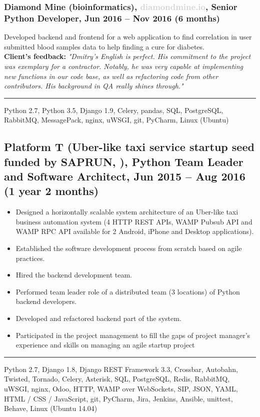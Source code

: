 \documentclass[a4paper,8pt]{extarticle}
\newcommand{\chref}[2]{\href{#1}{\underline{\smash{#2}}}}  %
\newcommand{\itchref}[2]{\chref{#1}{\textit{#2}}}  %
\newcommand{\chrule}{\vspace{3pt}\hrule}
\begin{document}
\subsubsection*{Diamond Mine (bioinformatics), \textcolor{lightgray}{diamondmine.io}, Senior Python Developer, Jun 2016 -- Nov 2016 (6 months)}
Developed backend and frontend for a web application to find correlation in user submitted blood samples data to help finding a cure for diabetes.\\
\textbf{Client's feedback:} \textit{"Dmitry's English is perfect. His commitment to the project was exemplary for a contractor. Notably, he was very capable at implementing new functions in our code base, as well as refactoring code from other contributors. His background in QA really shines through."}
\chrule
Python 2.7, Python 3.5, Django 1.9, Celery, pandas, SQL, PostgreSQL, RabbitMQ, MessagePack, nginx, uWSGI, git, PyCharm, Linux (Ubuntu)

\subsection*{Platform T (Uber-like taxi service startup seed funded by SAPRUN, \itchref{https://www.saprun.com}{www.saprun.com}), Python Team Leader and Software Architect, Jun 2015 – Aug 2016 (1 year 2 months)}
\begin{itemize}
    \item Designed a horizontally scalable system architecture of an Uber-like taxi business automation system (4 HTTP REST APIs, WAMP Pubsub API and WAMP RPC API available for 2 Android, iPhone and Desktop applications).
    \item Established the software development process from scratch based on agile practices.
    \item Hired the backend development team.
    \item Performed team leader role of a distributed team (3 locations) of Python backend developers.
    \item Developed and refactored backend part of the system.
    \item Participated in the project management to fill the gaps of project manager's experience and skills on managing an agile startup project
\end{itemize}
\chrule
Python 2.7, Django 1.8, Django REST Framework 3.3, Crossbar, Autobahn, Twisted, Tornado, Celery, Asterisk, SQL, PostgreSQL, Redis, RabbitMQ, uWSGI, nginx, Odoo, HTTP, WAMP over WebSockets, SIP, JSON, YAML, HTML / CSS / JavaScript, git, PyCharm, Jira, Jenkins, Ansible, unittest, Behave, Linux (Ubuntu 14.04)
\end{document}
